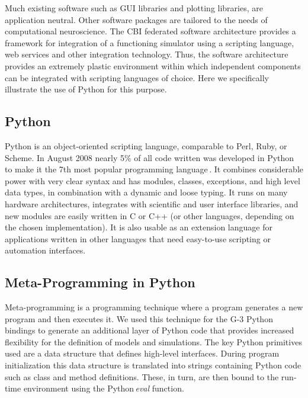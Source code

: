 \documentclass[12pt]{article}
\begin{document}
Much existing software such as GUI libraries and plotting
libraries, are application neutral.  Other software packages are
tailored to the needs of computational neuroscience.  The CBI federated
software architecture provides a framework for integration of a functioning
simulator using a scripting language, web services and other
integration technology.  Thus, the software architecture provides
an extremely plastic environment within which independent components can
be integrated with scripting languages of choice.  Here we
specifically illustrate the use of Python for this purpose.

\subsection{Python}

Python is an object-oriented scripting language, comparable to Perl,
Ruby, or Scheme.  In August 2008 nearly 5\% of all code written was
developed in Python to make it the 7th most popular programming
language\,\cite{software09:_tiobe_progr_commun_index}. It combines
considerable power with very clear syntax and has modules, classes,
exceptions, and high level data types, in combination with a dynamic
and loose typing. It runs on many hardware architectures, integrates
with scientific and user interface libraries, and new modules are
easily written in C or C++ (or other languages, depending on the
chosen implementation). It is also usable as an extension language for
applications written in other languages that need easy-to-use
scripting or automation interfaces.


\subsection{Meta-Programming in Python}

Meta-programming is a programming technique where a program generates
a new program and then executes it.  We used this technique for the G-3
Python bindings to generate an additional layer of Python code that
provides increased flexibility for the definition of models and
simulations.  The key Python primitives used are a data structure that
defines high-level interfaces.  During program initialization this
data structure is translated into strings containing Python code such as
class and method definitions. These, in turn, are then bound to the run-time
environment using the Python\,{\it eval} function.
\end{document}
